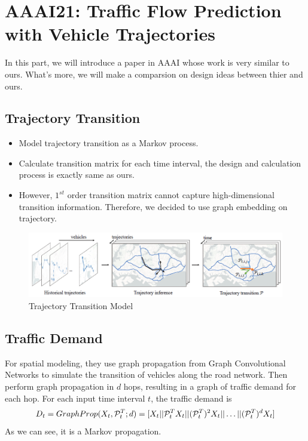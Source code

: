 \documentclass[fontset=none]{ctexart}
\theoremstyle{definition}
\theoremstyle{remark}
\begin{document}
\clearpage
\section{AAAI21: Traffic Flow Prediction with Vehicle Trajectories}
In this part, we will introduce a paper in AAAI\cite{MingqianLi2021TrafficFP} whose work is very similar to ours.
What's more, we will make a comparsion on design ideas between thier and ours.

\subsection{Trajectory Transition}
\begin{itemize}
  \item Model trajectory transition as a Markov process.
  \item Calculate transition matrix for each time interval, the design and calculation process is exactly same as ours.
  \item However, $1^{st}$ order transition matrix cannot capture high-dimensional transition information.
        Therefore, we decided to use graph embedding on trajectory.
\end{itemize}
\begin{figure}[htb]
  \centering
  \includegraphics[width=\textwidth]{images/9-1-1.png}
  \caption{Trajectory Transition Model}
  \label{911}
\end{figure}

\subsection{Traffic Demand}
For spatial modeling, they use graph propagation from Graph Convolutional
Networks to simulate the transition of
vehicles along the road network. Then perform graph propagation
in $d$ hops, resulting in a graph of traffic demand for
each hop. For each input time interval $t$, the traffic demand is
\begin{equation}
  D_t=GraphProp(X_t, \mathcal P_t^T;d)
  =[X_t||\mathcal P_t^TX_t||(\mathcal P_t^T)^2X_t||\dots||(\mathcal P_t^T)^dX_t]
  \notag
\end{equation}
As we can see, it is a Markov propagation.
\end{document}
